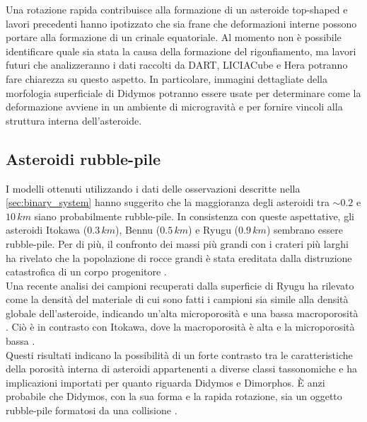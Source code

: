 Una rotazione rapida contribuisce alla formazione di un asteroide top-shaped e lavori precedenti \citep{walsh_rotational_2008, walsh_spin-up_2012} hanno ipotizzato che sia frane che deformazioni interne possono portare alla formazione di un crinale equatoriale. Al momento non è possibile identificare quale sia stata la causa della formazione del rigonfiamento, ma lavori futuri che analizzeranno i dati raccolti da DART, LICIACube e Hera potranno fare chiarezza su questo aspetto. In particolare, immagini dettagliate della morfologia superficiale di Didymos potranno essere usate per determinare come la deformazione avviene in un ambiente di microgravità e per fornire vincoli alla struttura interna dell'asteroide.

\subsection{Asteroidi rubble-pile}
I modelli ottenuti utilizzando i dati delle osservazioni descritte nella \cref{sec:binary_system} hanno suggerito che la maggioranza degli asteroidi tra $\sim 0.2$ e $10\,km$ siano probabilmente rubble-pile. In consistenza con queste aspettative, gli asteroidi Itokawa ($0.3\,km$), Bennu ($0.5\,km$) e Ryugu ($0.9\,km$) sembrano essere rubble-pile. Per di più, il confronto dei massi più grandi con i crateri più larghi ha rivelato che la popolazione di rocce grandi è stata ereditata dalla distruzione catastrofica di un corpo progenitore \citep{DellaGiustina2019}.\\
Una recente analisi dei campioni recuperati dalla superficie di Ryugu ha rilevato come la densità del materiale di cui sono fatti i campioni sia simile alla densità globale dell'asteroide, indicando un'alta microporosità e una bassa macroporosità \citep{pilorget_first_2021}. Ciò è in contrasto con Itokawa, dove la macroporosità è alta e la microporosità bassa \citep{tsuchiyama_three-dimensional_2014}.\\
Questi risultati indicano la possibilità di un forte contrasto tra le caratteristiche della porosità interna di asteroidi appartenenti a diverse classi tassonomiche e ha implicazioni importati per quanto riguarda Didymos e Dimorphos. È anzi probabile che Didymos, con la sua forma e la rapida rotazione, sia un oggetto rubble-pile formatosi da una collisione \citep{zhang_creep_2021}. %

